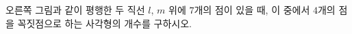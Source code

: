 \hspace*{2mm}\begin{minipage}[t]{\dimexpr\linewidth-2mm\relax}\vspace{0pt}
\noindent\begin{minipage}[t]{0.58\linewidth}\vspace{0pt}\raggedright 오른쪽 그림과 같이 평행한 두 직선 $l$, $m$ 위에 $7$개의 점이 있을 때, 이 중에서 $4$개의 점을 꼭짓점으로 하는 사각형의 개수를 구하시오.\end{minipage}\hfill\begin{minipage}[t]{0.4\linewidth}\vspace{0pt}\centering \resizebox{\ifdim\width>\linewidth\linewidth\else\width\fi}{!}{}\end{minipage}\par\end{minipage}
